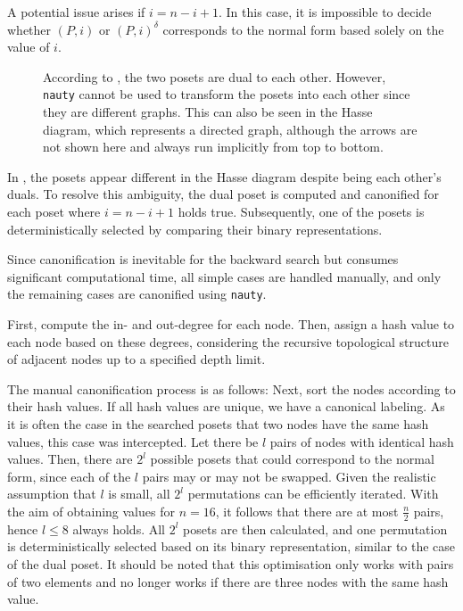 \documentclass[twoside,leqno,twocolumn]{article}
\newcommand{\dual}[1]{{#1}^{\delta}}
\begin{document}
A potential issue arises if $i = n - i + 1$.
In this case, it is impossible to decide whether $(P, i)$ or $\dual{(P, i)}$ corresponds to the normal form based solely on the value of $i$.

\begin{figure}[!b]
  \centering
  
  \caption{According to , the two posets are dual to each other.
    However, \texttt{nauty} cannot be used to transform the posets into each other since they are different graphs.
    This can also be seen in the Hasse diagram, which represents a directed graph, although the arrows are not shown here and always run implicitly from top to bottom.}
  \label{fig:backward_canonify_problematic}
\end{figure}

In , the posets appear different in the Hasse diagram despite being each other's duals.
To resolve this ambiguity, the dual poset is computed and canonified for each poset where $i = n - i + 1$ holds true.
Subsequently, one of the posets is deterministically selected by comparing their binary representations.

Since canonification is inevitable for the backward search but consumes significant computational time, all simple cases are handled manually, and only the remaining cases are canonified using \texttt{nauty}.

First, compute the in- and out-degree for each node.
Then, assign a hash value to each node based on these degrees, considering the recursive topological structure of adjacent nodes up to a specified depth limit.

The manual canonification process is as follows:
Next, sort the nodes according to their hash values.
If all hash values are unique, we have a canonical labeling.
As it is often the case in the searched posets that two nodes have the same hash values, this case was intercepted.
Let there be $l$ pairs of nodes with identical hash values.
Then, there are $2^l$ possible posets that could correspond to the normal form, since each of the $l$ pairs may or may not be swapped.
Given the realistic assumption that $l$ is small, all $2^l$ permutations can be efficiently iterated.
With the aim of obtaining values for $n = 16$, it follows that there are at most $\frac{n}{2}$ pairs, hence $l \leq 8$ always holds.
All $2^l$ posets are then calculated, and one permutation is deterministically selected based on its binary representation, similar to the case of the dual poset.
It should be noted that this optimisation only works with pairs of two elements and no longer works if there are three nodes with the same hash value.
\end{document}
